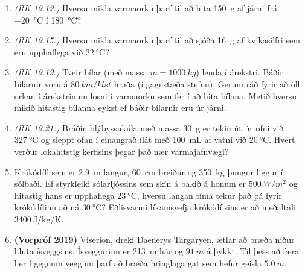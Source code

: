 \ifdefined \wholebook \else\documentclass[oneside]{book}\usepackage{EdlBook}\graphicspath{{figures/}}
\begin{document}
\begin{enumerate}[label = \textbf{Dæmi \thechapter.\arabic*.}]


\item \textit{(RK 19.12.)} Hversu mikla varmaorku þarf til að hita \SI{150}{g} af járni frá \SI{-20}{\celsius} í \SI{180}{\celsius}?


\item \textit{(RK 19.15.)} Hversu mikla varmaorku þarf til að sjóða \SI{16}{g} af kvikasilfri sem eru upphaflega við $\SI{22}{\celsius}$?

\item \textit{(RK 19.19.)} Tveir bílar (með massa $m = \SI{1000}{kg}$) lenda í árekstri. Báðir bílarnir voru á $\SI{80}{km/klst}$ hraða (í gagnstæða stefnu). Gerum ráð fyrir að öll orkan í árekstrinum losni í varmaorku sem fer í að hita bílana. Metið hversu mikið hitastig bílanna eykst ef báðir bílarnir eru úr járni.

\item \textit{(RK 19.21.)} Bráðin blýbyssukúla með massa \SI{30}{g} er tekin út úr ofni við $\SI{327}{\celsius}$ og sleppt ofan í einangrað ílát með \SI{100}{mL} af vatni við $\SI{20}{\celsius}$. Hvert verður lokahitstig kerfisins þegar það nær varmajafnvægi?

\item Krókódíll sem er \SI{2.9}{m} langur, \SI{60}{cm} breiður og \SI{350}{kg} þungur liggur í sólbaði. Ef styrkleiki sólarljóssins sem skín á bakið á honum er $\SI{500}{W/m^2}$ og hitastig hans er upphaflega $\SI{23}{\celsius}$, hversu langan tíma tekur það þá fyrir krókódílinn að ná $\SI{30}{\celsius}$? Eðlisvarmi líkamsvefja krókódílsins er að meðaltali $\SI{3400}{\joule\per\kilogram\per\kelvin}$.

\item \textbf{(Vorpróf 2019)} Viserion, dreki Daenerys Targaryen, ætlar að bræða niður hluta ísveggsins. Ísveggurinn er \SI{213}{m} hár og $\SI{91}{m}$ á þykkt. Til þess að færa her í gegnum vegginn þarf að bræða hringlaga gat sem hefur geisla $\SI{5.0}{m}$.
\end{enumerate}
\end{document}
